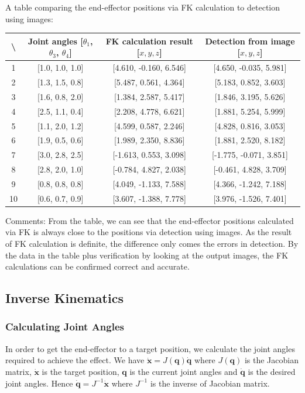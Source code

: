 \documentclass[11pt]{article}
\begin{document}
A table comparing the end-effector positions via FK calculation to detection using images:
\begin{center} 
\begin{tabular}{ | c | c | c | c | }
\hline
\textbackslash & Joint angles [$\theta_{1}$, $\theta_{3}$, $\theta_{4}$] & FK calculation result [$x, y, z$] & Detection from image [$x, y, z$] \\ 
\hline 
1 & [1.0, 1.0, 1.0] & [4.610, -0.160, 6.546] & [4.650, -0.035, 5.981]  \\
2 & [1.3, 1.5, 0.8] & [5.487, 0.561, 4.364] & [5.183, 0.852, 3.603]  \\
3 & [1.6, 0.8, 2.0] & [1.384, 2.587, 5.417] & [1.846, 3.195, 5.626]  \\
4 & [2.5, 1.1, 0.4] & [2.208, 4.778, 6.621] & [1.881, 5.254, 5.999]  \\
5 & [1.1, 2.0, 1.2] & [4.599, 0.587, 2.246] & [4.828, 0.816, 3.053]  \\
6 & [1.9, 0.5, 0.6] & [1.989, 2.350, 8.836] & [1.881, 2.520, 8.182]  \\
7 & [3.0, 2.8, 2.5] & [-1.613, 0.553, 3.098] & [-1.775, -0.071, 3.851]  \\
8 & [2.8, 2.0, 1.0] & [-0.784, 4.827, 2.038] & [-0.461, 4.828, 3.709]  \\
9 & [0.8, 0.8, 0.8] & [4.049, -1.133, 7.588] & [4.366, -1.242, 7.188]  \\
10 & [0.6, 0.7, 0.9] & [3.607, -1.388, 7.778] & [3.976, -1.526, 7.401]  \\
\hline 
\end{tabular} 
\end{center}
Comments: From the table, we can see that the end-effector positions calculated via FK is always close to the positions via detection using images. As the result of FK calculation is definite, the difference only comes the errors in detection. By the data in the table plus verification by looking at the output images, the FK calculations can be confirmed correct and accurate.

\subsection{Inverse Kinematics}

\subsubsection{Calculating Joint Angles}

In order to get the end-effector to a target position, we calculate the joint angles required to achieve the effect. We have $\mathbf{\dot{x}}=J(\mathbf{q})\mathbf{\dot{q}}$ where $J(\mathbf{q})$ is the Jacobian matrix, $\mathbf{\dot{x}}$ is the target position, $\mathbf{q}$ is the current joint angles and $\mathbf{\dot{q}}$ is the desired joint angles. Hence $\mathbf{\dot{q}}=J^{-1}\mathbf{\dot{x}}$ where $J^{-1}$ is the inverse of Jacobian matrix.
\end{document}
